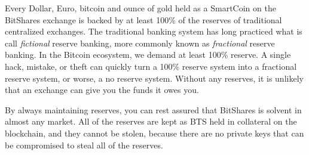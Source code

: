 Every Dollar, Euro, bitcoin and ounce of gold held as a SmartCoin on the
BitShares exchange is backed by at least 100\% of the reserves of traditional
centralized exchanges. The traditional banking system has long practiced what
is call \emph{fictional} reserve banking, more commonly known as
\emph{fractional} reserve banking. In the Bitcoin ecosystem, we demand at least
100\% reserve. A single hack, mistake, or theft can quickly turn a 100\%
reserve system into a fractional reserve system, or worse, a no reserve system.
Without any reserves, it is unlikely that an exchange can give you the funds it
owes you.

By always maintaining reserves, you can rest assured that BitShares is solvent
in almost any market. All of the reserves are kept as BTS held in collateral on
the blockchain, and they cannot be stolen, because there are no private keys
that can be compromised to steal all of the reserves.
